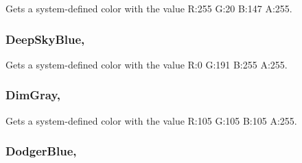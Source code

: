 Gets a system-\/defined color with the value R\+:255 G\+:20 B\+:147 A\+:255.

\hypertarget{structMicrosoft_1_1Xna_1_1Framework_1_1Color_a27bbd85b7873d4dfc82f2047ee3e323e}{}
\subsubsection[{Deep\+Sky\+Blue}]{ Deep\+Sky\+Blue\hspace{0.3cm}{\ttfamily [static]}, {\ttfamily [get]}}\label{structMicrosoft_1_1Xna_1_1Framework_1_1Color_a27bbd85b7873d4dfc82f2047ee3e323e}


Gets a system-\/defined color with the value R\+:0 G\+:191 B\+:255 A\+:255.

\hypertarget{structMicrosoft_1_1Xna_1_1Framework_1_1Color_a7b14678cca6c42f642b87382dd7a4a0f}{}
\subsubsection[{Dim\+Gray}]{ Dim\+Gray\hspace{0.3cm}{\ttfamily [static]}, {\ttfamily [get]}}\label{structMicrosoft_1_1Xna_1_1Framework_1_1Color_a7b14678cca6c42f642b87382dd7a4a0f}


Gets a system-\/defined color with the value R\+:105 G\+:105 B\+:105 A\+:255.

\hypertarget{structMicrosoft_1_1Xna_1_1Framework_1_1Color_a8ed776fe1463ae8ce1c4962d8fbb70b6}{}
\subsubsection[{Dodger\+Blue}]{ Dodger\+Blue\hspace{0.3cm}{\ttfamily [static]}, {\ttfamily [get]}}\label{structMicrosoft_1_1Xna_1_1Framework_1_1Color_a8ed776fe1463ae8ce1c4962d8fbb70b6}


